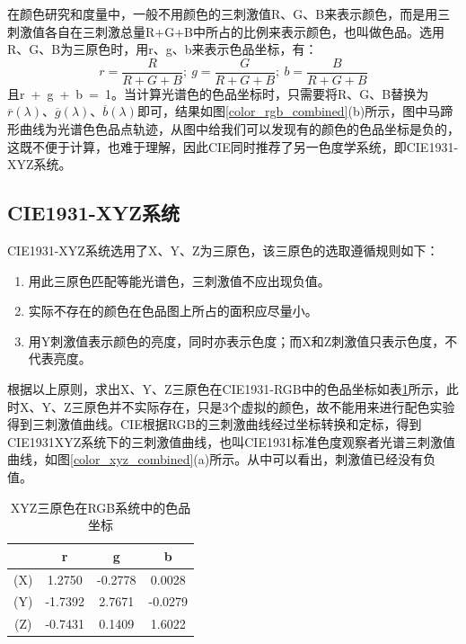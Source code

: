 在颜色研究和度量中，一般不用颜色的三刺激值R、G、B来表示颜色，而是用三刺激值各自在三刺激总量R+G+B中所占的比例来表示颜色，也叫做色品。选用R、G、B为三原色时，用r、g、b来表示色品坐标，有：
\begin{equation}
\label{sepin}
r=\dfrac{R}{R+G+B};~g=\dfrac{G}{R+G+B};~b=\dfrac{B}{R+G+B}
\end{equation}
且r~+~g~+~b~=~1。当计算光谱色的色品坐标时，只需要将R、G、B替换为$\overline{r}(\lambda)\mbox{、}\overline{g}(\lambda)\mbox{、}\overline{b}(\lambda)$即可，结果如图\ref{color_rgb_combined}(b)所示，图中马蹄形曲线为光谱色色品点轨迹，从图中给我们可以发现有的颜色的色品坐标是负的，这既不便于计算，也难于理解，因此CIE同时推荐了另一色度学系统，即CIE1931-XYZ系统。

\subsection{CIE1931-XYZ系统}
CIE1931-XYZ系统选用了X、Y、Z为三原色，该三原色的选取遵循规则如下：
\begin{enumerate}[(1)]
	\item 
	用此三原色匹配等能光谱色，三刺激值不应出现负值。
	\item 
	实际不存在的颜色在色品图上所占的面积应尽量小。
	\item 
	用Y刺激值表示颜色的亮度，同时亦表示色度；而X和Z刺激值只表示色度，不代表亮度。
\end{enumerate}

根据以上原则，求出X、Y、Z三原色在CIE1931-RGB中的色品坐标如表\ref{coordinate_XYZ}所示，此时X、Y、Z三原色并不实际存在，只是3个虚拟的颜色，故不能用来进行配色实验得到三刺激值曲线。CIE根据RGB的三刺激曲线经过坐标转换和定标，得到CIE1931XYZ系统下的三刺激值曲线，也叫CIE1931标准色度观察者光谱三刺激值曲线，如图\ref{color_xyz_combined}(a)所示。从中可以看出，刺激值已经没有负值。

\begin{table}[htb]
	\captionsetup{justification=centering}
	\caption{XYZ三原色在RGB系统中的色品坐标}
	\label{coordinate_XYZ}
	\centering
	\begin{tabular}[t]{|cccc|}
		\hline
		& r & g & b  \\
		\hline
		(X) & 1.2750 & -0.2778 & 0.0028  \\
		\hline
		(Y)	& -1.7392 & 2.7671 & -0.0279  \\
		\hline
		(Z)	& -0.7431 & 0.1409 & 1.6022  \\
		\hline
	\end{tabular}
\end{table}


